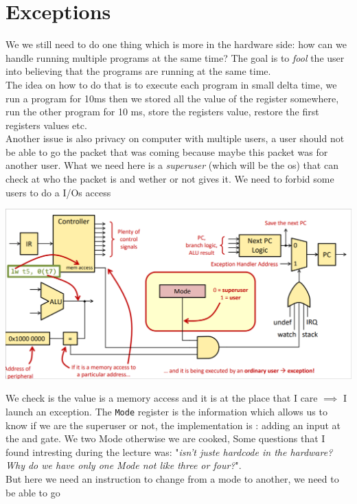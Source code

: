 \section{Exceptions}
We we still need to do one thing which is more in the hardware side: how can we handle running multiple programs at the same time? The goal is to \textit{fool} the user into believing that the programs are running at the same time.\\
The idea on how to do that is to execute each program in small delta time, we run a program for 10ms then we stored all the value of the register somewhere, run the other program for 10 ms, store the registers value, restore the first registers values etc.\\
Another issue is also privacy on computer with multiple users, a user should not be able to go the packet that was coming because maybe this packet was for another user. What we need here is a \textit{superuser} (which will be the os) that can check at who the packet is and wether or not gives it. We need to forbid some users to do a I/Os access
\begin{center}
\includegraphics[scale=0.3]{screenshots/2025-10-15.png}
\end{center}
We check is the value is a memory access and it is at the place that I care $\implies$ I launch an exception. The \texttt{Mode} register is the information which allows us to know if we are the superuser or not, the implementation is : adding an input at the and gate. We  two Mode otherwise we are cooked, Some questions that I found intresting during the lecture was: "\textit{isn't juste hardcode in the hardware? Why do we have only one Mode not like three or four?}".\\
But here we need an instruction to change from a mode to another, we need to be able to go    
